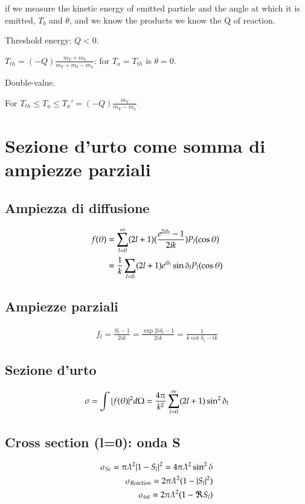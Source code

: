 \documentclass[main.tex]{subfiles}
\begin{document}
if we measure the kinetic energy of emitted particle and the angle at which it is emitted, $T_b$ and $\theta$, and we know the products we know the Q of reaction.

\begin{itemize*}
\item Threshold energy: $Q<0$.

$T_{th}=(-Q)\frac{m_Y+m_b}{m_Y+m_b-m_a}$: for $T_a=T_{th}$ is $\theta=0$.

\item Double-value.

For $T_{th}\leq T_a\leq T_a'=(-Q)\frac{m_Y}{m_Y-m_a}$

\end{itemize*}


\section{Sezione d'urto come somma di ampiezze parziali}

\subsection{Ampiezza di diffusione}
\begin{align*}
f(\theta)&=\sum_{l=0}^{\infty}(2l+1)(\frac{e^{2i\delta_l}-1}{2ik})P_l(\cos{\theta})\\
&=\frac{1}{k}\sum_{l=0}(2l+1)e^{i\delta_l}\sin{\delta_l}P_l(\cos{\theta})
\end{align*}

\subsection{Ampiezze parziali}
\begin{align*}
f_l=\frac{S_l-1}{2ik}=\frac{\exp{2i\delta_l}-1}{2ik}=\frac{1}{k\cot{\delta_l}-ik}
\end{align*}

\subsection{Sezione d'urto}
\begin{equation*}
\sigma=\int|f(\theta)|^2d\Omega=\frac{4\pi}{k^2}\sum_{l=0}^{\infty}(2l+1)\sin^2{\delta_l}
\end{equation*}

\subsection{Cross section (l=0): onda S}
\begin{align*}
\sigma_{Sc}=\pi\lambdabar^2|1-S_l|^2=4\pi\lambdabar^2\sin^2{\delta}\\
\sigma_{Reaction}=2\pi\lambdabar^2(1-|S_l|^2)\\
\sigma_{tot}=2\pi\lambdabar^2(1-\Re{S_l})
\end{align*}
\end{document}
